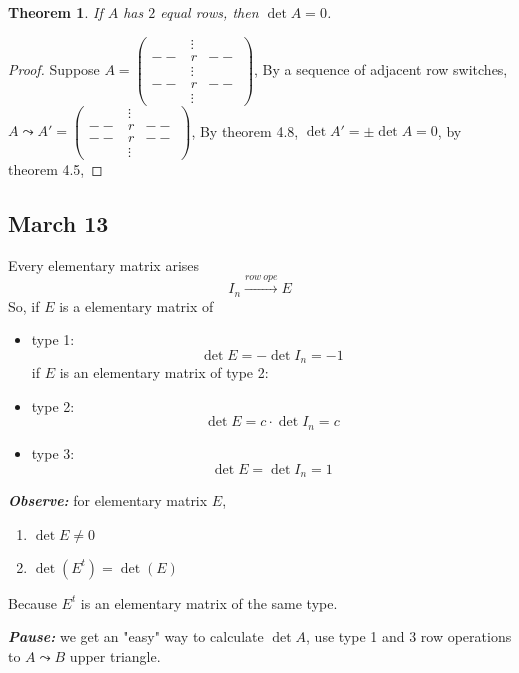 \documentclass[12pt]{article}
\newtheorem{theorem}{Theorem}[subsection]
\begin{document}
\begin{theorem}
	If $A$ has $2$ equal rows, then $\det A = 0$. 
\end{theorem}
\begin{proof}
	Suppose 
	$A = \begin{pmatrix}
				& \vdots&	\\
			-- & r		&--	\\
				& \vdots&	\\
			-- & r		&--	\\
				& \vdots&
		\end{pmatrix}$, 
By a sequence of adjacent row switches, $A \leadsto A' = \begin{pmatrix}
				& \vdots&	\\
			-- & r		&--	\\
			-- & r		&--	\\
				& \vdots&
		\end{pmatrix}$, By theorem 4.8, $\det A' = \pm \det A = 0$, by theorem
		4.5, 
		
\end{proof}




\newpage
\subsection{March 13}
Every elementary matrix arises
\[
	I_n \overset{row \ ope}{\longrightarrow} E
\]
So, if $E$ is a elementary matrix of 
\begin{itemize}
\item type 1: 
\[
	\det E = -\det I_n = -1
\]
if $E$ is an elementary matrix of type 2: 
\item type 2:
\[
	\det E = c\cdot \det I_n = c
\]
\item type 3:
	\[
		\det E = \det I_n = 1
	\]
\end{itemize}

\textbf{\textit{Observe:}} for elementary matrix $E$, 
\begin{enumerate}
	\item $\det E \neq 0$
	\item $\det (E^t) = \det (E)$ 
\end{enumerate}
Because $E^t$ is an elementary matrix of the same type. 

\textbf{\textit{Pause:}} 
we get an "easy" way to calculate $\det A$, use type 1 and 3 row operations
to $A \leadsto B$ upper triangle. 
\end{document}
